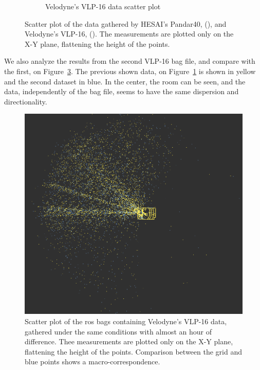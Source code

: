 \begin{figure}[ht!]
\begin{subfigure}[t]{0.45\textwidth}
	\caption{Velodyne's VLP-16 data scatter plot}
	\label{fig:bosch-vlp16-1}
\end{subfigure}
\caption[Scatter plot top-view of both \acp{lidar} interference on the dataset provided by Bosch.]{Scatter plot of the data gathered by HESAI's Pandar40, (), and Velodyne's VLP-16, (). The measurements are plotted only on the X-Y plane, flattening the height of the points.}
\label{fig:bosch-pandar-vs-vlp16}
\end{figure}

We also analyze the results from the second VLP-16 bag file, and compare with the first, on Figure~\ref{fig:bosch-vlp16-comparison}. The previous shown data, on Figure~\ref{fig:bosch-vlp16-1} is shown in yellow and the second dataset in blue. In the center, the room can be seen, and the data, independently of the bag file, seems to have the same dispersion and directionality.

\begin{figure}[ht!]
\centering
\includegraphics[scale=0.33]{img/bosch/vlp16-tests-overlaid.png}
\caption[Scattered plot of VLP-16 interference taken on two different instants, on the same conditions.]{Scatter plot of the \ac{ros} bags containing Velodyne's VLP-16 data, gathered under the same conditions with almost an hour of difference. Thee measurements are plotted only on the X-Y plane, flattening the height of the points. Comparison between the grid and blue points shows a macro-correspondence.}
\label{fig:bosch-vlp16-comparison}
\end{figure}

